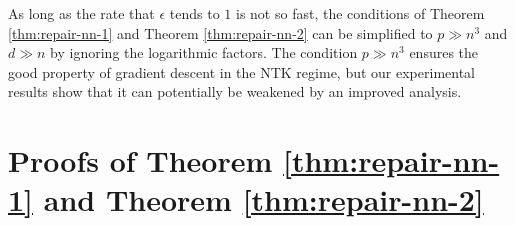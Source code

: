\begin{remark}
As long as the rate that $\epsilon$ tends to $1$ is not so fast, the conditions of Theorem \ref{thm:repair-nn-1} and Theorem \ref{thm:repair-nn-2} can be simplified to $p\gg n^3$ and $d\gg n$ by ignoring the logarithmic factors. The condition $p\gg n^3$ ensures the good property of gradient descent in the NTK regime, but our experimental results show that it can potentially be weakened by an improved analysis.
\end{remark}

\iffalse
\begin{remark}
When the nonlinear activation is replaced by ReLU $\psi(t)=\max(t,0)$, \nb{add text}
\end{remark}
\fi


\section{Proofs of Theorem \ref{thm:repair-nn-1} and Theorem \ref{thm:repair-nn-2}}\label{sec:pf-nn-repair}


